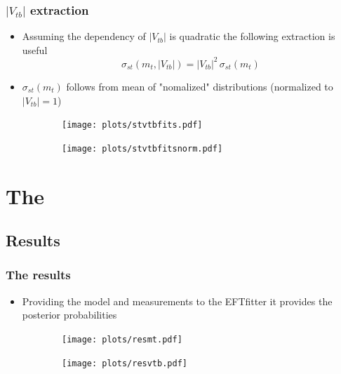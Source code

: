 \documentclass{beamer}
\begin{document}
\begin{frame}
\frametitle{$|V_{tb}|$ extraction}
		\begin{itemize}
			\item Assuming the dependency of $|V_{tb}|$ is quadratic the following extraction is useful
			\begin{equation*}
			\sigma_{st}(m_t,|V_{tb}|) = |V_{tb}|^2 \, \sigma_{st}(m_t)
			\end{equation*}
			\item $\sigma_{st}(m_t)$ follows from mean of "nomalized" distributions (normalized to $|V_{tb}|=1$)
		\end{itemize}
	\vspace{-0.2cm}
	\begin{figure}
			\begin{subfigure}{0.49\textwidth}
			\texttt{[image: plots/stvtbfits.pdf]}
			\end{subfigure}
			\hfill
			\begin{subfigure}{0.49\textwidth}
			\texttt{[image: plots/stvtbfitsnorm.pdf]}
			\end{subfigure}
		\end{figure}
\end{frame}

\section{The}
\subsection{Results}
\begin{frame}
\frametitle{The results}
	\begin{itemize}
		\item Providing the model and measurements to the EFTfitter it provides the posterior probabilities
	\end{itemize}
	\begin{figure}
			\begin{subfigure}{0.49\textwidth}
			\texttt{[image: plots/resmt.pdf]}
			\end{subfigure}
			\hfill
			\begin{subfigure}{0.49\textwidth}
			\texttt{[image: plots/resvtb.pdf]}
			\end{subfigure}
		\end{figure}
\end{frame}
\end{document}
